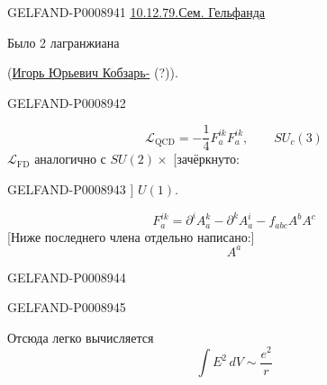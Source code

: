 \begin{GelfandAdjacentEvidence}{GELFAND-P000894}{1}
\underline{\underline{10.12.79.}}\qquad \underline{Сем. Гельфанда}

 Было 2 лагранжиана

(\uline{Игорь Юрьевич Кобзарь-} (?)).
\end{GelfandAdjacentEvidence}
\begin{GelfandAdjacentEvidence}{GELFAND-P000894}{2}


\begin{equation*}
\mathcal L_{\mathrm{QCD}}=-\frac14 F_a^{ik}F_a^{ik},\qquad SU_c(3) \tag{1}
\end{equation*}
$\mathcal L_{\mathrm{FD}}$ аналогично с $SU(2)\times$ [зачёркнуто: 
\end{GelfandAdjacentEvidence}
\begin{GelfandAdjacentEvidence}{GELFAND-P000894}{3}
] $U(1)$.

\begin{equation*}
F_a^{ik}=\partial^i A_a^k-\partial^k A_a^i-f_{abc}A^b A^c \tag{2}
\end{equation*}
[Ниже последнего члена отдельно написано:]
\[
A^a
\]
\end{GelfandAdjacentEvidence}
\begin{GelfandAdjacentEvidence}{GELFAND-P000894}{4}

\end{GelfandAdjacentEvidence}
\begin{GelfandAdjacentEvidence}{GELFAND-P000894}{5}


Отсюда легко вычисляется
\begin{equation*}
\int E^2\,dV\sim\frac{e^2}{r} \tag{3}
\end{equation*}
\end{GelfandAdjacentEvidence}
